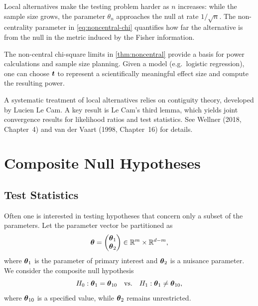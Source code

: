 \begin{remark}[Interpretation]\label{rem:local-int}
Local alternatives make the testing problem harder as \(n\) increases:
while the sample size grows, the parameter \(\theta_n\) approaches the null at rate \(1/\sqrt{n}\).
The non-centrality parameter in \eqref{eq:noncentral-chi} quantifies how far the alternative is from the null
in the metric induced by the Fisher information.
\end{remark}

\begin{note}\label{note:power}
The non-central chi-square limits in \autoref{thm:noncentral} provide a basis for
power calculations and sample size planning.
Given a model (e.g.\ logistic regression), one can choose \(\boldsymbol{t}\) to represent
a scientifically meaningful effect size and compute the resulting power.
\end{note}

\begin{remark}\label{rem:reading}
A systematic treatment of local alternatives relies on contiguity theory,
developed by Lucien Le Cam.
A key result is Le Cam's third lemma, which yields joint convergence results
for likelihood ratios and test statistics.
See Wellner (2018, Chapter~4) and van der Vaart (1998, Chapter~16) for details.
\end{remark}

\section{Composite Null Hypotheses}

\subsection{Test Statistics}

Often one is interested in testing hypotheses that concern only a subset of the parameters.
Let the parameter vector be partitioned as
\begin{equation*}\label{eq:theta-partition}
\boldsymbol{\theta} =
\begin{pmatrix}
\boldsymbol{\theta}_1 \\
\boldsymbol{\theta}_2
\end{pmatrix}
\in \mathbb{R}^m \times \mathbb{R}^{d-m},
\end{equation*}
where \(\boldsymbol{\theta}_1\) is the parameter of primary interest and \(\boldsymbol{\theta}_2\) is a nuisance parameter.
We consider the composite null hypothesis
\begin{equation}\label{eq:composite-null}
H_0 : \boldsymbol{\theta}_1 = \boldsymbol{\theta}_{10}
\quad \text{vs.} \quad
H_1 : \boldsymbol{\theta}_1 \neq \boldsymbol{\theta}_{10},
\end{equation}
where \(\boldsymbol{\theta}_{10}\) is a specified value, while \(\boldsymbol{\theta}_2\) remains unrestricted.

